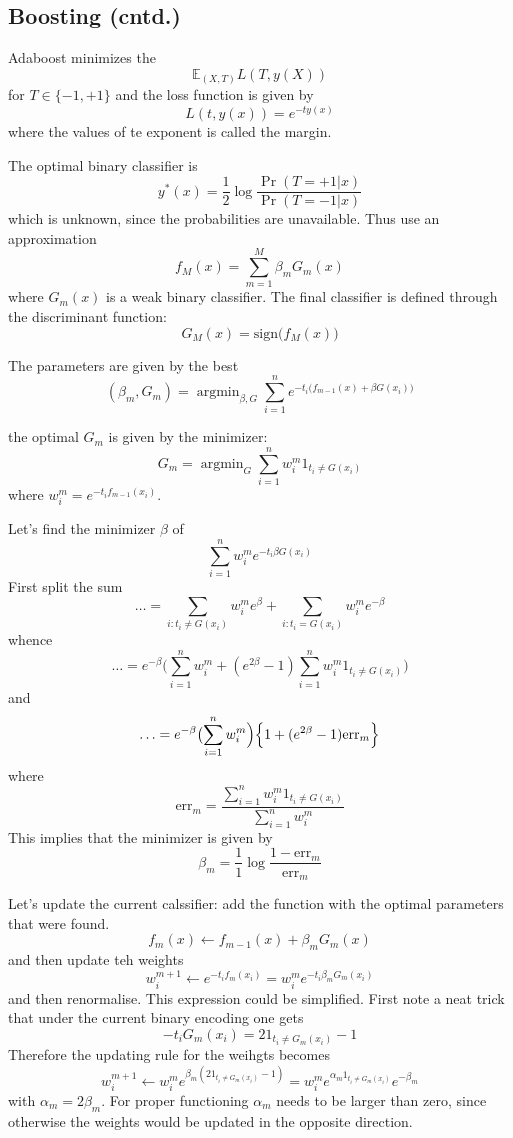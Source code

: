 \documentclass[a4paper]{article}
\newcommand{\ex}{\mathbb{E}}
\newcommand{\argmin}{\mathop{\text{argmin}}}
\begin{document}
\subsection{Boosting (cntd.)} %
\label{sub:boosting_continued}

Adaboost minimizes the 
\[\ex_{(X,T)} L(T, y(X))\]
for $T\in \{-1,+1\}$ and the loss function is given by 
\[L(t, y(x)) = e^{-t y(x)}\]
where the values of te exponent is called the margin.

The optimal binary classifier is 
\[y^*(x) = \frac{1}{2} \log\frac{\Pr(T=+1\rvert x)}{\Pr(T=-1\rvert x)}\]
which is unknown, since the probabilities are unavailable. Thus use an approximation
\[f_M(x) = \sum_{m=1}^M \beta_m G_m(x)\]
where $G_m(x)$ is a weak binary classifier. The final classifier is defined through
the discriminant function:
\[G_M(x) = \text{sign}\bigl(f_M(x) \bigr)\]

The parameters are given by the best 
\[
(\beta_m, G_m)
= \argmin_{\beta, G} \sum_{i=1}^n e^{-t_i \bigl( f_{m-1}(x) + \beta G(x_i) \bigr) }\]

the optimal $G_m$ is given by the minimizer:
\[ G_m = \argmin_{G} \sum_{i=1}^n w^m_i 1_{t_i \neq G(x_i) } \]
where $w^m_i = e^{-t_i f_{m-1}(x_i)}$.

Let's find the minimizer $\beta$ of 
\[\sum_{i=1}^n w^m_i e^{-t_i \beta G(x_i) }\]
First split the sum
\[\ldots 
= \sum_{i: t_i \neq G(x_i)} w^m_i  e^\beta
+ \sum_{i: t_i = G(x_i)} w^m_i  e^{-\beta} \]
whence
\[\ldots 
= e^{-\beta} \bigl( \sum_{i=1}^n w^m_i 
+ (e^{2\beta}-1) \sum_{i=1}^n w^m_i 1_{t_i \neq G(x_i)}
\Bigr) \]
and
\[\ldots 
= e^{-\beta} \bigl( \sum_{i=1}^n w^m_i \Bigr) \Bigl\{ 
1 + (e^{2\beta}-1) \text{err}_m
\Bigr\} \]
where
\[\text{err}_m = \frac{\sum_{i=1}^n w^m_i 1_{t_i \neq G(x_i)}}{\sum_{i=1}^n w^m_i} \]
This implies that the minimizer is given by
\[
\beta_m = \frac{1}{1}\log \frac{1-\text{err}_m}{\text{err}_m}
\]

Let's update the current calssifier: add the function with the optimal parameters
that were found.
\[ f_m(x) \leftarrow f_{m-1}(x) + \beta_m G_m(x) \]
and then update teh weights
\[
w^{m+1}_i \leftarrow e^{-t_i f_m(x_i)} = w^m_i e^{-t_i \beta_m G_m(x_i)}
\]
and then renormalise. This expression could be simplified. First note a neat trick
that under the current binary encoding one gets
\[ -t_i G_m(x_i) = 2 1_{t_i \neq G_m(x_i)} - 1 \]
Therefore the updating rule for the weihgts becomes 
\[
w^{m+1}_i
\leftarrow w^m_i e^{\beta_m ( 2 1_{t_i \neq G_m(x_i)} - 1 )}
= w^m_i e^{\alpha_m 1_{t_i \neq G_m(x_i)}} e^{-\beta_m}
\]
with $\alpha_m = 2\beta_m$. For proper functioning $\alpha_m$ needs to be larger than
zero, since otherwise the weights would be updated in the opposite direction.
\end{document}
